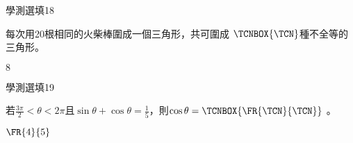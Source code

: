 \begin{QUESTIONS}
\begin{QUESTION}
    \end{QUESTION}
    \begin{QUESTION}
        \begin{ExamInfo}{83}{學測}{選填}{18}
        \end{ExamInfo}
        \begin{ExamAnsRateInfo}{}{}{}{}
        \end{ExamAnsRateInfo}
        \begin{QBODY}
            每次用20根相同的火柴棒圍成一個三角形，共可圍成 $\TCNBOX{\TCN}$種不全等的三角形。
        \end{QBODY}
        \begin{QFROMS}
        \end{QFROMS}
        \begin{QTAGS}\end{QTAGS}
        \begin{QANS}
            $8$
        \end{QANS}
        \begin{QSOLLIST}
        \end{QSOLLIST}
        \begin{QEMPTYSPACE}
        \end{QEMPTYSPACE}
    \end{QUESTION}
    \begin{QUESTION}
        \begin{ExamInfo}{83}{學測}{選填}{19}
        \end{ExamInfo}
        \begin{ExamAnsRateInfo}{}{}{}{}
        \end{ExamAnsRateInfo}
        \begin{QBODY}
        \end{QBODY}
        \begin{QFROMS}
            	若$\frac{3\pi }{2}<\theta <2\pi $且$\sin \theta +\cos \theta =\frac{1}{5}$，則$\cos \theta =\TCNBOX{\FR{\TCN}{\TCN}}$ 。
        \end{QFROMS}
        \begin{QTAGS}\end{QTAGS}
        \begin{QANS}
            $\FR{4}{5}$
        \end{QANS}
        \begin{QSOLLIST}
        \end{QSOLLIST}
        \begin{QEMPTYSPACE}
        \end{QEMPTYSPACE}
    \end{QUESTION}

\end{QUESTIONS}
